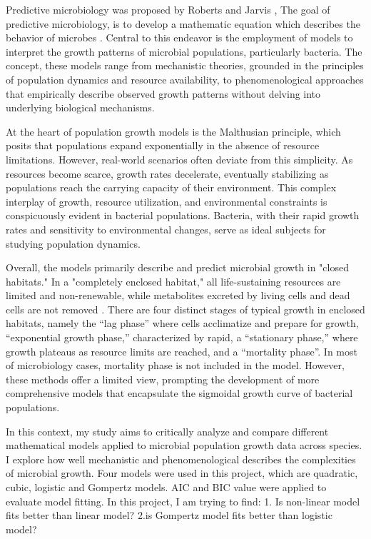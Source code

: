 \documentclass{article}
\begin{document}
Predictive microbiology was proposed by Roberts and Jarvis \cite{ross2003}, The goal of predictive microbiology, is to develop a mathematic equation which describes the behavior of microbes \cite{md2011 }. Central to this endeavor is the employment of models to interpret the growth patterns of microbial populations, particularly bacteria. The concept, these models range from mechanistic theories, grounded in the principles of population dynamics and resource availability, to phenomenological approaches that empirically describe observed growth patterns without delving into underlying biological mechanisms. 


At the heart of population growth models is the Malthusian principle\cite{mcatee1936}, which posits that populations expand exponentially in the absence of resource limitations. However, real-world scenarios often deviate from this simplicity. As resources become scarce, growth rates decelerate, eventually stabilizing as populations reach the carrying capacity of their environment. This complex interplay of growth, resource utilization, and environmental constraints is conspicuously evident in bacterial populations. Bacteria, with their rapid growth rates and sensitivity to environmental changes, serve as ideal subjects for studying population dynamics.

Overall, the models primarily describe and predict microbial growth in "closed habitats." In a "completely enclosed habitat," all life-sustaining resources are limited and non-renewable, while metabolites excreted by living cells and dead cells are not removed \cite{peleg2011}. There are four distinct stages of typical growth in enclosed habitats, namely the “lag phase” where cells acclimatize and prepare for growth, “exponential growth phase,” characterized by rapid, a “stationary phase,” where growth plateaus as resource limits are reached, and a “mortality phase”\cite{peleg2011}. In most of microbiology cases, mortality phase is not included in the model. However, these methods offer a limited view, prompting the development of more comprehensive models that encapsulate the sigmoidal growth curve of bacterial populations.



In this context, my study aims to critically analyze and compare different mathematical models applied to microbial population growth data across species. I explore how well mechanistic and phenomenological describes the complexities of microbial growth. Four models were used in this project, which are quadratic, cubic, logistic and Gompertz models. AIC and BIC value were applied to evaluate model fitting. In this project, I am trying to find: 1. Is non-linear model fits better than linear model? 2.is Gompertz model fits better than logistic model?
\end{document}
